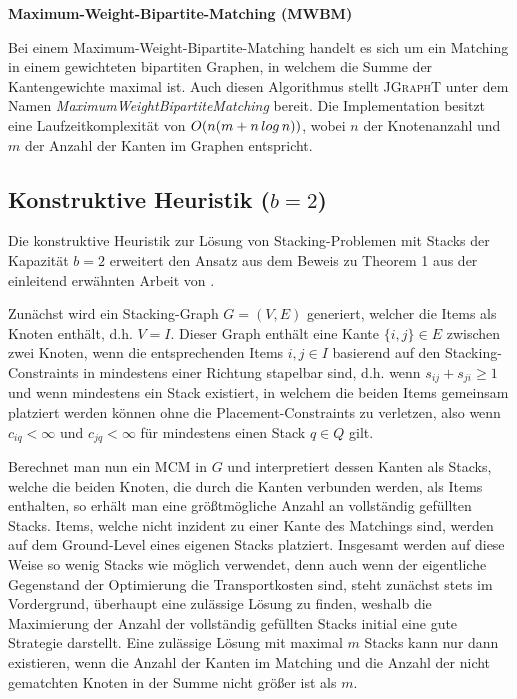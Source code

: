 \vfill
\pagebreak

\textbf{Maximum-Weight-Bipartite-Matching (MWBM)}

Bei einem Maximum-Weight-Bipartite-Matching handelt es sich um ein Matching in einem gewichteten bipartiten Graphen,
in welchem die Summe der Kantengewichte maximal ist. Auch diesen Algorithmus stellt \textsc{JGraphT} \cite{JGraphT}
unter dem Namen \textit{MaximumWeightBipartiteMatching} bereit.
Die Implementation besitzt eine Laufzeitkomplexität von $O(n (m + n \thinspace log \thinspace n))$, wobei $n$ der Knotenanzahl
und $m$ der Anzahl der Kanten im Graphen entspricht.

\subsection{Konstruktive Heuristik ($b = 2$)}
\label{sec:two_cap_heuristic}

Die konstruktive Heuristik zur Lösung von Stacking-Problemen mit Stacks der Kapazität $b=2$ erweitert den Ansatz aus dem Beweis
zu Theorem 1 aus der einleitend erwähnten Arbeit von \citet{Bruns2015}.

Zunächst wird ein Stacking-Graph $G = (V, E)$ generiert, welcher die Items als Knoten enthält, d.h. $V = I$. Dieser Graph
enthält eine Kante $\{i, j\} \in E$ zwischen zwei Knoten, wenn die entsprechenden Items $i, j \in I$ basierend auf den Stacking-Constraints
in mindestens einer Richtung stapelbar sind, d.h. wenn $s_{ij} + s_{ji} \geq 1$ und wenn mindestens ein Stack existiert, in welchem die beiden Items gemeinsam platziert werden können ohne die Placement-Constraints zu verletzen, also wenn $c_{iq} < \infty$ und $c_{jq} < \infty$ für
mindestens einen Stack $q \in Q$ gilt.

Berechnet man nun ein \textsc{MCM} in $G$ und interpretiert dessen Kanten als Stacks, welche die beiden Knoten, die durch
die Kanten verbunden werden, als Items enthalten, so erhält man eine größtmögliche Anzahl an vollständig gefüllten Stacks.
Items, welche nicht inzident zu einer Kante des Matchings sind, werden auf dem Ground-Level eines eigenen Stacks platziert.
Insgesamt werden auf diese Weise so wenig Stacks wie möglich verwendet, denn auch wenn der eigentliche Gegenstand der Optimierung die Transportkosten sind, steht zunächst stets im Vordergrund, überhaupt eine zulässige Lösung zu finden, weshalb die Maximierung der Anzahl der vollständig gefüllten Stacks initial eine gute Strategie darstellt.
Eine zulässige Lösung mit maximal $m$ Stacks kann nur dann existieren, wenn die Anzahl der Kanten im Matching und die Anzahl der nicht gematchten Knoten in der Summe nicht größer ist als $m$.

